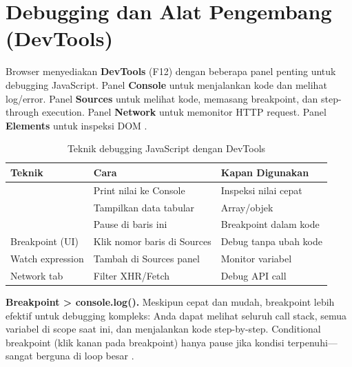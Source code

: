 ﻿\section{Debugging dan Alat Pengembang (DevTools)}

Browser menyediakan \textbf{DevTools} (F12) dengan beberapa panel penting untuk debugging JavaScript. Panel \textbf{Console} untuk menjalankan kode dan melihat log/error. Panel \textbf{Sources} untuk melihat kode, memasang breakpoint, dan step-through execution. Panel \textbf{Network} untuk memonitor HTTP request. Panel \textbf{Elements} untuk inspeksi DOM \cite{mdnToolsTesting}.

\begin{table}[H]
\centering
\begin{tabular}{|P{3.15cm}|P{4.55cm}|P{4.55cm}|}
\hline
\textbf{Teknik} & \textbf{Cara} & \textbf{Kapan Digunakan} \\
\hline
{} & Print nilai ke Console & Inspeksi nilai cepat \\
\hline
{} & Tampilkan data tabular & Array/objek \\
\hline
{} & Pause di baris ini & Breakpoint dalam kode \\
\hline
Breakpoint (UI) & Klik nomor baris di Sources & Debug tanpa ubah kode \\
\hline
Watch expression & Tambah di Sources panel & Monitor variabel \\
\hline
Network tab & Filter XHR/Fetch & Debug API call \\
\hline
\end{tabular}
\caption{Teknik debugging JavaScript dengan DevTools}
\end{table}

\begin{konsep}
\textbf{Breakpoint > console.log().} Meskipun  cepat dan mudah, breakpoint lebih efektif untuk debugging kompleks: Anda dapat melihat seluruh call stack, semua variabel di scope saat ini, dan menjalankan kode step-by-step. Conditional breakpoint (klik kanan pada breakpoint) hanya pause jika kondisi terpenuhi---sangat berguna di loop besar \cite{mdnToolsTesting}.
\end{konsep}

